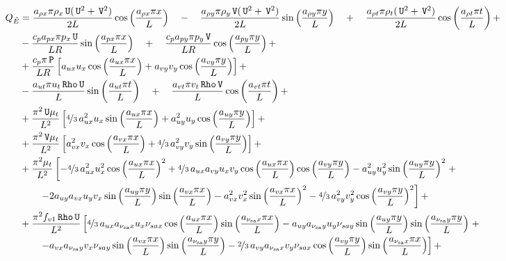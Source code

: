 \documentclass[10pt]{article}
\newcommand{\Rho}{\,\mathtt{Rho}}
\newcommand{\PP}{\,\mathtt{P}}
\newcommand{\U}{\,\mathtt{U}}
\newcommand{\V}{\,\mathtt{V}}
\newcommand{\sa}{\nu_{\mathrm{sa}}}
\newcommand{\tE}{\tilde{E}}
\begin{document}
\begin{equation*}
 \begin{split}
Q_{\tE}&= \dfrac{ a_{\rho x} \pi \rho_x \U(\U^2+\V^2) }{2L}\cos\left(\dfrac{a_{\rho x} \pi x}{L}\right)\quad -\quad \dfrac{ a_{\rho y} \pi \rho_y \V(\U^2+ \V^2) }{2L}\sin\left(\dfrac{a_{\rho y} \pi y}{L}\right)\quad +\quad \dfrac{a_{\rho t} \pi \rho_t (\U^2+\V^2) }{2L}\cos\left(\dfrac{a_{\rho t} \pi t}{L}\right)+\\
&-\dfrac{c_p a_{px} \pi p_x \U }{LR}\sin\left(\dfrac{a_{px} \pi x}{L}\right)\quad+\quad\dfrac{c_p a_{py} \pi p_y \V }{LR}\cos\left(\dfrac{a_{py} \pi y}{L}\right)+\\
&+\dfrac{c_p \pi \PP}{LR}\left[a_{ux} u_x \cos\left(\dfrac{a_{ux} \pi x}{L}\right)+a_{vy} v_y \cos\left(\dfrac{a_{vy} \pi y}{L}\right)\right] +\\
&-\dfrac{a_{ut} \pi u_t \Rho \U }{L}\sin\left(\dfrac{a_{ut} \pi t}{L}\right)\quad+\quad\dfrac{a_{vt} \pi v_t \Rho \V }{L}\cos\left(\dfrac{a_{vt} \pi t}{L}\right)+\\
&+ \dfrac{\pi^2  \U \mu_t}{L^2}\left[\nicefrac{4}{3}\, a_{ux}^2 u_x \sin\left(\dfrac{a_{ux} \pi x}{L}\right)+a_{uy}^2 u_y \cos\left(\dfrac{a_{uy} \pi y}{L}\right)\right]+\\
&+\dfrac{\pi^2  \V \mu_t}{L^2}\left[a_{vx}^2 v_x \cos\left(\dfrac{a_{vx} \pi x}{L}\right)+\nicefrac{4}{3}\, a_{vy}^2 v_y \sin\left(\dfrac{a_{vy} \pi y}{L}\right)\right] +\\
&+\dfrac{\pi^2 \mu_t}{L^2}\left[-\nicefrac{4}{3}\, a_{ux}^2 u_x^2 \cos\left(\dfrac{a_{ux} \pi x}{L}\right)^2+\nicefrac{4}{3}\, a_{ux} a_{vy} u_x v_y \cos\left(\dfrac{a_{ux} \pi x}{L}\right) \cos\left(\dfrac{a_{vy} \pi y}{L}\right)-a_{uy}^2 u_y^2 \sin\left(\dfrac{a_{uy} \pi y}{L}\right)^2\right.+\\
   &\qquad\left.-2 a_{uy} a_{vx} u_y v_x \sin\left(\dfrac{a_{uy} \pi y}{L}\right) \sin\left(\dfrac{a_{vx} \pi x}{L}\right)-a_{vx}^2 v_x^2 \sin\left(\dfrac{a_{vx} \pi x}{L}\right)^2-\nicefrac{4}{3}\, a_{vy}^2 v_y^2 \cos\left(\dfrac{a_{vy} \pi y}{L}\right)^2\right] +\\
&+\dfrac{\pi^2 f_{v1} \Rho \U}{L^2}\left[\nicefrac{4}{3}\, a_{ux} a_{\sa x} u_x \nu_{sa x} \cos\left(\dfrac{a_{ux} \pi x}{L}\right) \sin\left(\dfrac{a_{\sa x} \pi x}{L}\right)-a_{uy} a_{\sa y} u_y \nu_{sa y} \sin\left(\dfrac{a_{uy} \pi y}{L}\right) \sin\left(\dfrac{a_{\sa y} \pi y}{L}\right)\right.+\\
     &\qquad\left.-a_{vx} a_{\sa y} v_x \nu_{sa y} \sin\left(\dfrac{a_{vx} \pi x}{L}\right) \sin\left(\dfrac{a_{\sa y} \pi y}{L}\right)-\nicefrac{2}{3}\, a_{vy} a_{\sa x} v_y \nu_{sa x} \cos\left(\dfrac{a_{vy} \pi y}{L}\right) \sin\left(\dfrac{a_{\sa x} \pi x}{L}\right)\right] +\\

\end{split}
\end{equation*}
\end{document}
